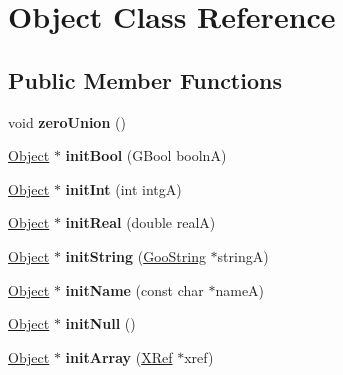 \hypertarget{class_object}{}\section{Object Class Reference}
\label{class_object}
\subsection*{Public Member Functions}
\begin{DoxyCompactItemize}
\item 
\mbox{\label{class_object_a262dfe8a3371b6eca91dec6a2e325242}} 
void {\bfseries zero\+Union} ()
\item 
\mbox{\label{class_object_a22cb04f8096ca902f7e67728202849a4}} 
\hyperlink{class_object}{Object} $\ast$ {\bfseries init\+Bool} (G\+Bool boolnA)
\item 
\mbox{\label{class_object_aea39346e042827fd6ad5733189272ee1}} 
\hyperlink{class_object}{Object} $\ast$ {\bfseries init\+Int} (int intgA)
\item 
\mbox{\label{class_object_a4c8f23dedb74277306d020dba865eb1c}} 
\hyperlink{class_object}{Object} $\ast$ {\bfseries init\+Real} (double realA)
\item 
\mbox{\label{class_object_a8a3cca621cddb0cc42c1c7c886d7dd6d}} 
\hyperlink{class_object}{Object} $\ast$ {\bfseries init\+String} (\hyperlink{class_goo_string}{Goo\+String} $\ast$stringA)
\item 
\mbox{\label{class_object_a38fa76ad621b99e9d3ebd911d04aaabb}} 
\hyperlink{class_object}{Object} $\ast$ {\bfseries init\+Name} (const char $\ast$nameA)
\item 
\mbox{\label{class_object_a9a0e47a78cccb9c0463962e4a18a9cbf}} 
\hyperlink{class_object}{Object} $\ast$ {\bfseries init\+Null} ()
\item 
\mbox{\label{class_object_a9a01af21b2eeb140503e07d8890e2361}} 
\hyperlink{class_object}{Object} $\ast$ {\bfseries init\+Array} (\hyperlink{class_x_ref}{X\+Ref} $\ast$xref)
\item 
\mbox{\label{class_object_abcb436ad8dda0539fb0f937b4d2a8fa6}} 

\end{DoxyCompactItemize}
